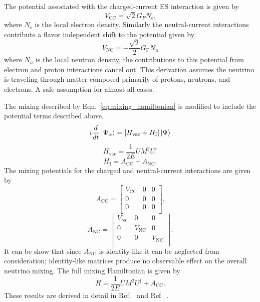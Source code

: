 The potential associated with the charged-current ES interaction
is given by
\begin{equation}
V_{\mathrm{CC}} = \sqrt{2}G_{F}N_{\text{e}}\text{,}
\end{equation}
where $N_{\mathrm{e}}$ is the local electron density.
Similarly the neutral-current interactions contribute a flavor independent
shift to the potential given by
\begin{equation}
V_{\mathrm{NC}} = -\frac{\sqrt{2}}{2} G_{\text{F}} N_{\mathrm{n}}
\end{equation}
where $N_{n}$ is the local neutron density, the contributions to this potential
from electron and proton interactions cancel out.
This derivation assumes the neutrino is traveling through matter composed primarily
of protons, neutrons, and electrons.
 A safe assumption for almost all cases.

The mixing described by Eqn.~\eqref{eq:mixing_hamiltonian} is modified to include
the potential terms described above.
\begin{equation}
i\frac{d}{dt}\ket{\Psi_{\alpha}} = \left[H_{\mathrm{vac}} + H_{\mathrm{I}}\right]\ket{\Psi}
\end{equation}
\begin{equation}
H_{\mathrm{vac}}  = \frac{1}{2E}UM^{2}U^{\dagger}
\end{equation}
\begin{equation}
 H_{\mathrm{I}} =  A_{\mathrm{CC}} + A_{\mathrm{NC}}\text{.}
\end{equation}
The mixing potentials for the charged and neutral-current interactions
are given by
\begin{equation}
A_{\mathrm{CC}} = 
\begin{bmatrix}
    V_{\mathrm{CC}} & 0 & 0  \\
    0 & 0 & 0  \\
    0 & 0 & 0\\
\end{bmatrix}\text{,}
\end{equation}
\begin{equation}
A_{\mathrm{NC}} = 
\begin{bmatrix}
    V_{\mathrm{NC}} & 0 & 0  \\
    0 & V_{\mathrm{NC}} & 0  \\
    0 & 0 & V_{\mathrm{NC}}\\
\end{bmatrix}\text{.}
\end{equation}
It can be show that since $A_{\mathrm{NC}}$ is identity-like it can be neglected
from consideration;
identity-like matrices produce no observable effect on the overall neutrino mixing.
The full mixing Hamiltonian is given by
\begin{equation}
H = \frac{1}{2E}UM^{2}U^{\dagger} + A_{\mathrm{CC}}\text{.}
\end{equation}
These results are derived in detail in Ref.~\cite{wolfenstein_osc} and Ref.~\citep{giuntikim}.

